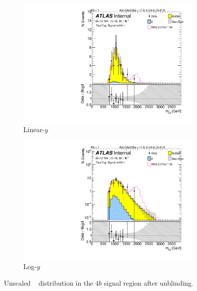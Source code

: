 \begin{figure}[htb!]
\begin{center}
    \captionsetup{justification=centering}
    \begin{subfigure}[b]{0.45\textwidth}
        \includegraphics[width=\textwidth,angle=-90]{figures/boosted/Signal_Syst/Moriond_bkg_9_FourTag_Signal_mHH_l.pdf}
        \caption{Linear-$y$}
        \label{fig:boosted-4b-signal-lin}
    \end{subfigure}
    \quad
    \begin{subfigure}[b]{0.45\textwidth}
        \includegraphics[width=\textwidth,angle=-90]{figures/boosted/Signal_Syst/Moriond_bkg_9_FourTag_Signal_mHH_l_1.pdf}
        \caption{Log-$y$}
        \label{fig:boosted-4b-signal-log}
    \end{subfigure}
  \caption{Unscaled \mtwoJ~ distribution in the $4b$ signal region after unblinding.}
  \label{fig:boosted-4b-signal-l}
\end{center}
\end{figure}


